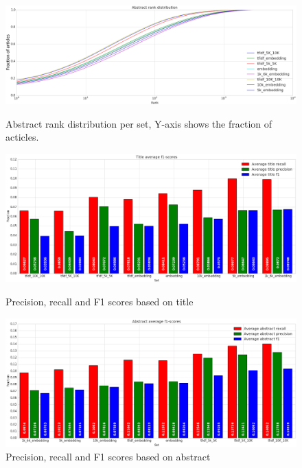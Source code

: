 \documentclass[runningheads]{llncs}
\begin{document}
\begin{figure}
\includegraphics[width=4.5in]{Plots/Abstract_rank_distribution}
\caption{Abstract rank distribution per set, Y-axis shows the fraction of acticles.}\label{figure:abstractDistribution}
\includegraphics[width=4.5in]{Plots/Title_avg_f1}
\caption{Precision, recall and F1 scores based on title}\label{figure:f1Title}
\includegraphics[width=4.5in]{Plots/Abstract_avg_f1}
\caption{Precision, recall and F1 scores based on abstract}\label{figure:f1Abstract}
\end{figure}
\FloatBarrier
\end{document}
